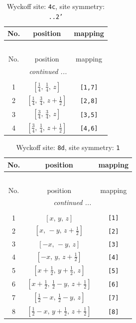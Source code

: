 \documentclass[fleqn,8pt]{jsarticle}
\begin{document}
\renewcommand{\arraystretch}{1.2}
\begin{longtable}{ccc}
\caption{Wyckoff site: {\tt 4c}, site symmetry: {\tt ..2'}}
 \\
 \hline \hline
No. & position & mapping \\ \hline \endfirsthead

\multicolumn{2}{l}{\tablename\ \thetable{}} \\
 \hline \hline
No. & position & mapping \\ \hline \endhead

 \hline \hline
\multicolumn{2}{r}{\footnotesize\it continued ...} \\ \endfoot

 \hline \hline
\multicolumn{2}{r}{} \\ \endlastfoot

1 & $\left[ \frac{1}{4},\, \frac{1}{4},\, z \right]$ & {\tt [1,7]} \\ \hline
2 & $\left[ \frac{1}{4},\, \frac{3}{4},\, z + \frac{1}{2} \right]$ & {\tt [2,8]} \\ \hline
3 & $\left[ \frac{3}{4},\, \frac{3}{4},\, z \right]$ & {\tt [3,5]} \\ \hline
4 & $\left[ \frac{3}{4},\, \frac{1}{4},\, z + \frac{1}{2} \right]$ & {\tt [4,6]} \\
\end{longtable}
\renewcommand{\arraystretch}{1.2}
\begin{longtable}{ccc}
\caption{Wyckoff site: {\tt 8d}, site symmetry: {\tt 1}}
 \\
 \hline \hline
No. & position & mapping \\ \hline \endfirsthead

\multicolumn{2}{l}{\tablename\ \thetable{}} \\
 \hline \hline
No. & position & mapping \\ \hline \endhead

 \hline \hline
\multicolumn{2}{r}{\footnotesize\it continued ...} \\ \endfoot

 \hline \hline
\multicolumn{2}{r}{} \\ \endlastfoot

1 & $\left[ x,\, y,\, z \right]$ & {\tt [1]} \\ \hline
2 & $\left[ x,\, - y,\, z + \frac{1}{2} \right]$ & {\tt [2]} \\ \hline
3 & $\left[ - x,\, - y,\, z \right]$ & {\tt [3]} \\ \hline
4 & $\left[ - x,\, y,\, z + \frac{1}{2} \right]$ & {\tt [4]} \\ \hline
5 & $\left[ x + \frac{1}{2},\, y + \frac{1}{2},\, z \right]$ & {\tt [5]} \\ \hline
6 & $\left[ x + \frac{1}{2},\, \frac{1}{2} - y,\, z + \frac{1}{2} \right]$ & {\tt [6]} \\ \hline
7 & $\left[ \frac{1}{2} - x,\, \frac{1}{2} - y,\, z \right]$ & {\tt [7]} \\ \hline
8 & $\left[ \frac{1}{2} - x,\, y + \frac{1}{2},\, z + \frac{1}{2} \right]$ & {\tt [8]} \\
\end{longtable}
\end{document}
